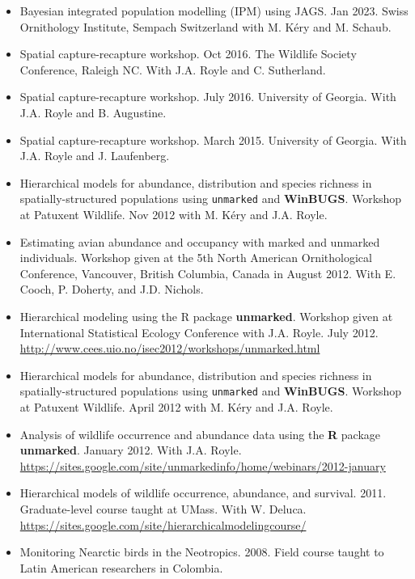 \documentclass[12pt]{article}
\begin{document}
\begin{itemize}

\item Bayesian integrated population modelling (IPM) using JAGS. Jan
  2023. Swiss Ornithology Institute, Sempach Switzerland with
  M. K\'ery and M. Schaub.

\item Spatial capture-recapture workshop. Oct 2016. The Wildlife
  Society Conference, Raleigh NC. With J.A. Royle and C. Sutherland. 

\item Spatial capture-recapture workshop. July 2016. University of
  Georgia. With J.A. Royle and B. Augustine.

\item Spatial capture-recapture workshop. March 2015. University of
  Georgia. With J.A. Royle and J. Laufenberg.

\item Hierarchical models for abundance, distribution
  and species richness in spatially-structured populations using
  \texttt{unmarked} and \textbf{WinBUGS}. Workshop at Patuxent Wildlife.
  Nov 2012 with M. K\'{e}ry and J.A. Royle.

\item Estimating avian abundance and occupancy with marked and
  unmarked individuals. Workshop given at the 5th North American
  Ornithological Conference, Vancouver, British Columbia,
  Canada in August 2012. With E. Cooch, P. Doherty, and J.D. Nichols.

\item Hierarchical modeling using the R package
  \textbf{unmarked}. Workshop given at International Statistical
  Ecology Conference with J.A. Royle. July 2012.
  \url{http://www.cees.uio.no/isec2012/workshops/unmarked.html}

\item Hierarchical models for abundance, distribution
  and species richness in spatially-structured populations using
  \texttt{unmarked} and \textbf{WinBUGS}. Workshop at Patuxent Wildlife.
  April 2012 with M. K\'{e}ry and J.A. Royle.

\item Analysis of wildlife occurrence and abundance data using the \textbf{R}
  package \textbf{unmarked}. January 2012. With J.A. Royle.
  \url{https://sites.google.com/site/unmarkedinfo/home/webinars/2012-january}

\item Hierarchical models of wildlife occurrence, abundance, and
  survival. 2011. Graduate-level course taught at
  UMass. With W. Deluca. \\
  \url{https://sites.google.com/site/hierarchicalmodelingcourse/}

\item Monitoring Nearctic birds in the Neotropics. 2008. Field course
  taught to Latin American researchers in Colombia.

\end{itemize}
\end{document}
